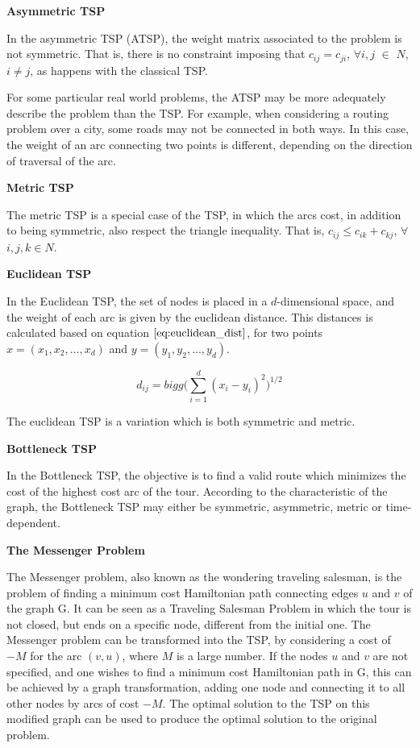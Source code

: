 \textbf{Asymmetric TSP}

In the asymmetric TSP (ATSP), the weight matrix associated to the problem is not symmetric. That is, there is no constraint imposing that $c_{ij} = c_{ji}$, $\forall i, j$ $\in$ $N$, $i \ne j$, as happens with the classical TSP.

For some particular real world problems, the ATSP may be more adequately describe the problem than the TSP. For example, when considering a routing problem over a city, some roads may not be connected in both ways. In this case, the weight of an arc connecting two points is different, depending on the direction of traversal of the arc.


\textbf{Metric TSP}

The metric TSP is a special case of the TSP, in which the arcs cost,
in addition to being symmetric, also respect the triangle inequality. That is,
$c_{ij} \leq c_{ik} + c_{kj}$, $\forall$ $i, j, k \in N$.


\textbf{Euclidean TSP}

In the Euclidean TSP, the set of nodes is placed in a $d$-dimensional space,
and the weight of each arc is given by the euclidean distance. This distances is
calculated based on equation $\ref{eq:euclidean_dist}$, for two points
$x = (x_{1}, x_{2}, ..., x_{d})$ and $y = (y_{1}, y_{2}, ..., y_{d})$.

\begin{equation}
\label{eq:euclidean_dist}
  d_{ij} = bigg( \sum_{i=1}^{d} (x_{i}-y_{i})^2\bigg)^{1/2}
\end{equation}

The euclidean TSP is a variation which is both symmetric and metric.


\textbf{Bottleneck TSP}

In the Bottleneck TSP, the objective is to find a valid route which minimizes the cost of the highest cost arc of the tour. According to the characteristic of the graph,
the Bottleneck TSP may either be symmetric, asymmetric, metric or time-dependent.


\textbf{The Messenger Problem}

The Messenger problem, also known as the wondering traveling salesman, is the problem of finding a minimum cost Hamiltonian path connecting edges $u$ and $v$ of the graph G. It can be seen as a Traveling Salesman Problem in which the tour is not closed, but ends on a specific node, different from the initial one. The Messenger problem can be transformed into the TSP, by considering a cost of $-M$ for the arc $(v, u)$, where $M$ is a large number. If the nodes $u$ and $v$ are not specified, and one wishes to find a minimum cost Hamiltonian path in G, this can be achieved by a graph transformation, adding one node and connecting it to all other nodes by arcs of cost $-M$. The optimal solution to the TSP on this modified graph can be used to produce the optimal solution to the original problem.